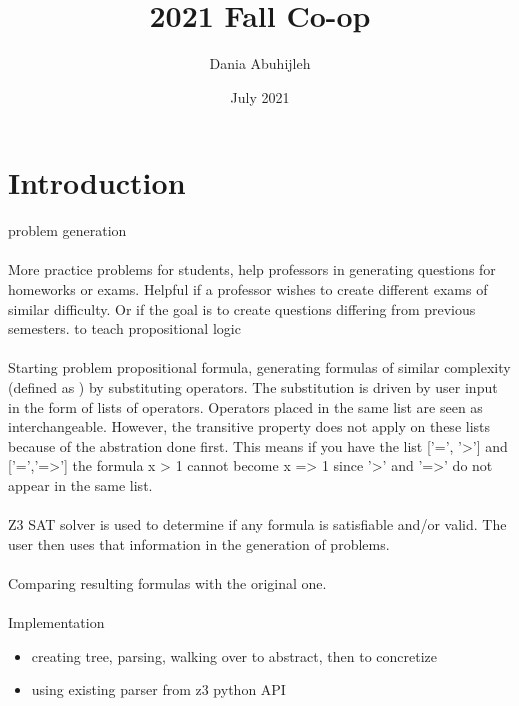 \documentclass{report}
\title{2021 Fall Co-op}
\author{Dania Abuhijleh }
\date{July 2021}
\begin{document}
\maketitle

\section{Introduction}
problem generation

\paragraph{}
More practice problems for students, help professors in generating questions for homeworks or exams. Helpful if a professor wishes to create different exams of similar difficulty. Or if the goal is to create questions differing from previous semesters. to teach propositional logic


\paragraph{}
Starting problem propositional formula, generating formulas of similar complexity (defined as ) by substituting operators. The substitution is driven by user input in the form of lists of operators. Operators placed in the same list are seen as interchangeable. However, the transitive property does not apply on these lists because of the abstration done first. This means if you have the list ['=', '>'] and ['=','=>'] the formula x > 1 cannot become x => 1 since '>' and '=>' do not appear in the same list. 


\paragraph{}
Z3 SAT solver is used to determine if any formula is satisfiable and/or valid. The user then uses that information in the generation of problems. 


\paragraph{}
Comparing resulting formulas with the original one.

\paragraph{}
Implementation

\begin{itemize}
\item creating tree, parsing, walking over to abstract, then to concretize
\item using existing parser from z3 python API
\end{itemize}
\end{document}
